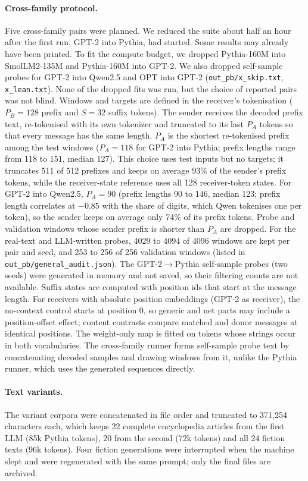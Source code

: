 \paragraph{Cross-family protocol.} Five cross-family pairs were planned. We reduced the suite about half an hour after the first run, GPT-2 into Pythia, had started. Some results may already have been printed. To fit the compute budget, we dropped Pythia-160M into SmolLM2-135M and Pythia-160M into GPT-2. We also dropped self-sample probes for GPT-2 into Qwen2.5 and OPT into GPT-2 (\texttt{out\_pb/x\_skip.txt}, \texttt{x\_lean.txt}). None of the dropped fits was run, but the choice of reported pairs was not blind. Windows and targets are defined in the receiver's tokenisation ($P_B=128$ prefix and $S=32$ suffix tokens). The sender receives the decoded prefix text, re-tokenised with its own tokenizer and truncated to its last $P_A$ tokens so that every message has the same length. $P_A$ is the shortest re-tokenised prefix among the test windows ($P_A=118$ for GPT-2 into Pythia; prefix lengths range from 118 to 151, median 127). This choice uses test inputs but no targets; it truncates 511 of 512 prefixes and keeps on average 93\% of the sender's prefix tokens, while the receiver-state reference uses all 128 receiver-token states. For GPT-2 into Qwen2.5, $P_A=90$ (prefix lengths 90 to 146, median 123; prefix length correlates at $-0.85$ with the share of digits, which Qwen tokenises one per token), so the sender keeps on average only 74\% of its prefix tokens. Probe and validation windows whose sender prefix is shorter than $P_A$ are dropped. For the real-text and LLM-written probes, 4029 to 4094 of 4096 windows are kept per pair and seed, and 253 to 256 of 256 validation windows (listed in \texttt{out\_pb/general\_audit.json}). The GPT-2$\to$Pythia self-sample probes (two seeds) were generated in memory and not saved, so their filtering counts are not available. Suffix states are computed with position ids that start at the message length. For receivers with absolute position embeddings (GPT-2 as receiver), the no-context control starts at position 0, so generic and net parts may include a position-offset effect; content contrasts compare matched and donor messages at identical positions. The weight-only map is fitted on tokens whose strings occur in both vocabularies. The cross-family runner forms self-sample probe text by concatenating decoded samples and drawing windows from it, unlike the Pythia runner, which uses the generated sequences directly.

\paragraph{Text variants.} The variant corpora were concatenated in file order and truncated to 371{,}254 characters each, which keeps 22 complete encyclopedia articles from the first LLM (85k Pythia tokens), 20 from the second (72k tokens) and all 24 fiction texts (96k tokens). Four fiction generations were interrupted when the machine slept and were regenerated with the same prompt; only the final files are archived.
